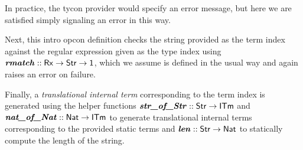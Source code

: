 \documentclass{llncs}
\begin{document}
In practice, the tycon provider would specify an error message, but here we are satisfied simply signaling an error in this way.

Next, this intro opcon definition checks the string provided as the term index against the regular expression given as the type index using ${\textbf{\textit{rmatch}}} :: {\sf Rx} \rightarrow {\sf Str} \rightarrow {\sf 1}$, which we assume is defined in the usual way and again raises an error on failure.

Finally, a \emph{translational internal term} corresponding to the term index is generated using the helper functions ${\textbf{\textit{str\_of\_Str}}} :: {\sf Str} \rightarrow {\sf ITm}$ and ${\textbf{\textit{nat\_of\_Nat}}} :: {\sf Nat} \rightarrow {\sf ITm}$ to generate  translational internal terms corresponding to the provided static terms and ${\textbf{\textit{len}}} :: {\sf Str} \rightarrow {\sf Nat}$ to statically compute the length of the string. 
\end{document}
